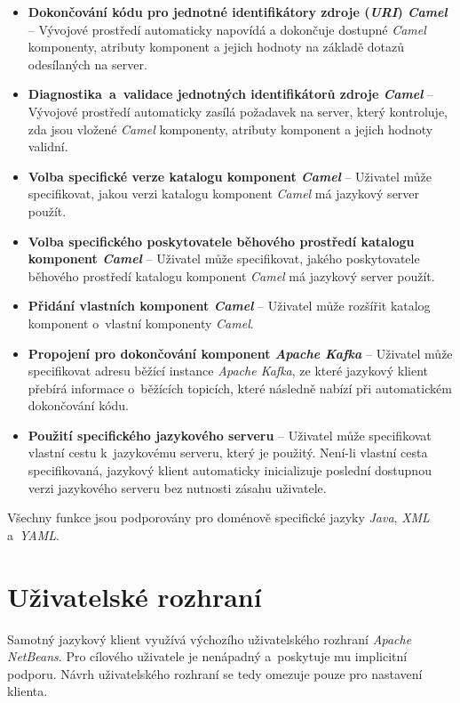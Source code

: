 \begin{itemize}
    \item \textbf{Dokončování kódu pro jednotné identifikátory zdroje (\emph{URI}) \emph{Camel}} -- Vývojové prostředí automaticky napovídá a dokončuje dostupné \emph{Camel} komponenty, atributy komponent a jejich hodnoty na základě dotazů odesílaných na server.
    \item \textbf{Diagnostika~a~validace jednotných identifikátorů zdroje \emph{Camel}} -- Vývojové prostředí automaticky zasílá požadavek na server, který kontroluje, zda jsou vložené \emph{Camel} komponenty, atributy komponent a jejich hodnoty validní.
    \item \textbf{Volba specifické verze katalogu komponent \emph{Camel}} -- Uživatel může specifikovat, jakou verzi katalogu komponent \emph{Camel} má jazykový server použít.
    \item \textbf{Volba specifického poskytovatele běhového prostředí katalogu komponent  \emph{Camel}} -- Uživatel může specifikovat, jakého poskytovatele běhového prostředí katalogu komponent \emph{Camel} má jazykový server použít.
    \item \textbf{Přidání vlastních komponent \emph{Camel}} -- Uživatel může rozšířit katalog komponent o~vlastní komponenty \emph{Camel}.
    \item \textbf{Propojení pro dokončování komponent \emph{Apache Kafka}} -- Uživatel může specifikovat adresu běžící instance \emph{Apache Kafka}, ze které jazykový klient přebírá informace o~běžících topicích, které následně nabízí při automatickém dokončování kódu.
    \item \textbf{Použití specifického jazykového serveru} -- Uživatel může specifikovat vlastní cestu k~jazykovému serveru, který je použitý. Není-li vlastní cesta specifikovaná, jazykový klient automaticky inicializuje poslední dostupnou verzi jazykového serveru bez nutnosti zásahu uživatele.
\end{itemize}

Všechny funkce jsou podporovány pro doménově specifické jazyky \emph{Java}, \emph{XML} a~\emph{YAML}. 

\section{Uživatelské rozhraní}
\label{navrhJazykovehoKlienta-uzivatelskeRozhrani}
Samotný jazykový klient využívá výchozího uživatelského rozhraní \emph{Apache NetBeans}. Pro cílového uživatele je nenápadný a~poskytuje mu implicitní podporu. Návrh uživatelského rozhraní se tedy omezuje pouze pro nastavení klienta. 

